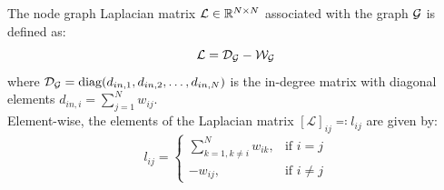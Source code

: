 \begin{definition}\label{def:ch_intro_graphLaplacian}
The node graph Laplacian matrix $\mathcal{L} \in \mathbb{R}^{N \times N}$ associated with the graph $\mathcal{G}$ is defined as:
\begin{equation}\label{eq:laplacian_def}
    \mathcal{L} = {\mathcal{D}}_{\mathcal{G}} - {\mathcal{W}}_{\mathcal{G}}
\end{equation}
where ${\mathcal{D}}_{\mathcal{G}} = \text{diag}(d_{in,1}, d_{in,2}, \dots, d_{in,N})$ is the in-degree matrix with diagonal elements $d_{in,i} = \sum_{j=1}^{N} w_{ij}$.\\
Element-wise, the elements of the Laplacian matrix $[\mathcal{L}]_{ij} \eqqcolon l_{ij}$ are given by:
\begin{equation}\label{eq:ch_intro_laplacianentries}
    l_{ij} = \begin{cases}
        \sum_{k=1, k \neq i}^{N} w_{ik}, & \text{if } i = j \\
        -w_{ij}, & \text{if } i \neq j
    \end{cases}
\end{equation}
\end{definition}
